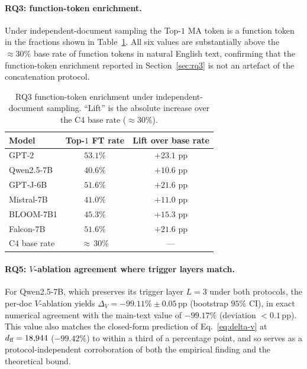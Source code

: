 \paragraph{RQ3: function-token enrichment.}
Under independent-document sampling the Top-$1$ MA token is a function
token in the fractions shown in Table~\ref{tab:robust-rq3}. All six
values are substantially above the $\approx\!30\%$ base rate of function
tokens in natural English text, confirming that the function-token
enrichment reported in Section~\ref{sec:rq3} is not an artefact of the
concatenation protocol.

\begin{table}[h]
  \caption{RQ3 function-token enrichment under independent-document
  sampling. ``Lift'' is the absolute increase over the C4 base rate
  ($\approx 30\%$).}
  \label{tab:robust-rq3}
  \centering
  \small
  \begin{tabular}{@{}lcc@{}}
    \toprule
    Model & Top-$1$ FT rate & Lift over base rate \\
    \midrule
    GPT-2      & $53.1\%$ & $+23.1$ pp \\
    Qwen2.5-7B & $40.6\%$ & $+10.6$ pp \\
    GPT-J-6B   & $51.6\%$ & $+21.6$ pp \\
    Mistral-7B & $41.0\%$ & $+11.0$ pp \\
    BLOOM-7B1  & $45.3\%$ & $+15.3$ pp \\
    Falcon-7B  & $51.6\%$ & $+21.6$ pp \\
    \midrule
    C4 base rate & ${\approx}\,30\%$ & --- \\
    \bottomrule
  \end{tabular}
\end{table}

\paragraph{RQ5: $V$-ablation agreement where trigger layers match.}
For Qwen2.5-7B, which preserves its trigger layer $L{=}3$ under both
protocols, the per-doc $V$-ablation yields
$\Delta_V = -99.11\% \pm 0.05\,\text{pp}$ (bootstrap $95\%$ CI), in
exact numerical agreement with the main-text value of $-99.17\%$
(deviation $<\!0.1\,\text{pp}$). This value also matches the closed-form
prediction of Eq.~\eqref{eq:delta-v} at $d_{\text{ff}} = 18{,}944$
($-99.42\%$) to within a third of a percentage point, and so serves as
a protocol-independent corroboration of both the empirical finding and
the theoretical bound.

